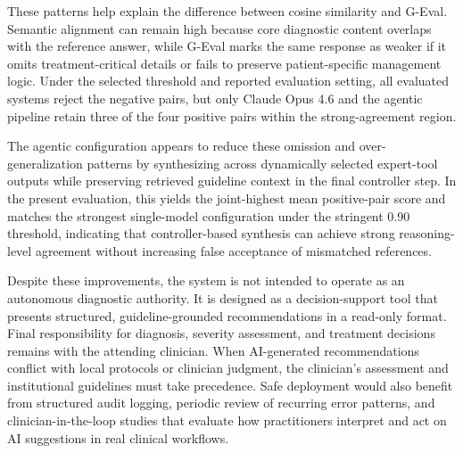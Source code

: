 \documentclass[preprint,12pt]{elsarticle}
\begin{document}
\begin{table}[!ht]
\centering
\caption{Observed error patterns in misaligned recommendations}
\label{tab:error_patterns}
\renewcommand{\arraystretch}{1.2}
\small
{}
\end{table}

These patterns help explain the difference between cosine similarity and G-Eval. Semantic alignment can remain high because core diagnostic content overlaps with the reference answer, while G-Eval marks the same response as weaker if it omits treatment-critical details or fails to preserve patient-specific management logic. Under the selected threshold and reported evaluation setting, all evaluated systems reject the negative pairs, but only Claude Opus 4.6 and the agentic pipeline retain three of the four positive pairs within the strong-agreement region.

The agentic configuration appears to reduce these omission and over-generalization patterns by synthesizing across dynamically selected expert-tool outputs while preserving retrieved guideline context in the final controller step. In the present evaluation, this yields the joint-highest mean positive-pair score and matches the strongest single-model configuration under the stringent 0.90 threshold, indicating that controller-based synthesis can achieve strong reasoning-level agreement without increasing false acceptance of mismatched references.

Despite these improvements, the system is not intended to operate as an autonomous diagnostic authority. It is designed as a decision-support tool that presents structured, guideline-grounded recommendations in a read-only format. Final responsibility for diagnosis, severity assessment, and treatment decisions remains with the attending clinician. When AI-generated recommendations conflict with local protocols or clinician judgment, the clinician's assessment and institutional guidelines must take precedence. Safe deployment would also benefit from structured audit logging, periodic review of recurring error patterns, and clinician-in-the-loop studies that evaluate how practitioners interpret and act on AI suggestions in real clinical workflows.
\end{document}
